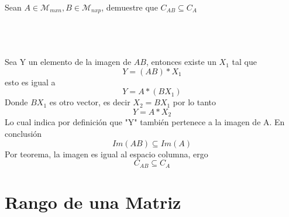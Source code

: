 \begin{ejercicio}
Sean $A\in \mathcal{M}_{mxn}, B \in \mathcal{M}_{nxp}$, demuestre que $C_{AB}\subseteq C_A$


~\\

\sol
~\\
~\\
Sea Y un elemento de la imagen de $AB$, entonces existe un $X_1$ tal que 
$$Y=(AB)*X_1$$
esto es igual a 
$$Y=A*(BX_1)$$
Donde $BX_1$ es otro vector, es decir $X_2=BX_1$
por lo tanto
$$Y=A*X_2$$
Lo cual indica por definición que "Y" también pertenece a la imagen de A.
En conclusión $$Im(AB) \subseteq Im(A)$$
Por teorema, la imagen es igual al espacio columna, ergo
$$C_{AB} \subseteq C_A$$

\end{ejercicio}

\section{Rango de una Matriz}

\newpage
